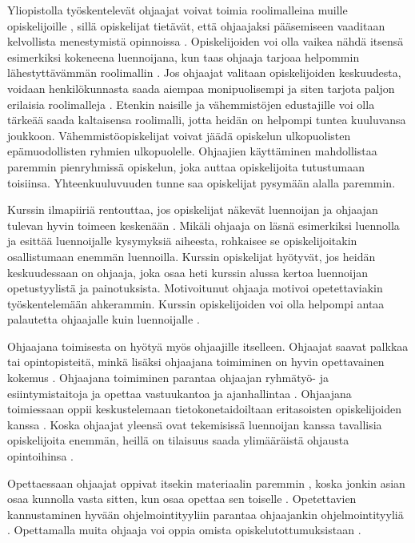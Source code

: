 \documentclass[finnish]{tktltiki2}
\theoremstyle{definition}
\theoremstyle{remark}
\begin{document}
Yliopistolla työskentelevät ohjaajat voivat toimia roolimalleina muille opiskelijoille \cite{Roberts95, Tashakkori05}, sillä opiskelijat tietävät, että ohjaajaksi pääsemiseen vaaditaan kelvollista menestymistä opinnoissa \cite{Bernstein}. Opiskelijoiden voi olla vaikea nähdä itsensä esimerkiksi kokeneena luennoijana, kun taas ohjaaja tarjoaa helpommin lähestyttävämmän roolimallin \cite{Roberts02}. Jos ohjaajat valitaan opiskelijoiden keskuudesta, voidaan henkilökunnasta saada aiempaa monipuolisempi ja siten tarjota paljon erilaisia roolimalleja \cite{Morgan02}. Etenkin naisille ja vähemmistöjen edustajille voi olla tärkeää saada kaltaisensa roolimalli, jotta heidän on helpompi tuntea kuuluvansa joukkoon. Vähemmistöopiskelijat voivat jäädä opiskelun ulkopuolisten epämuodollisten ryhmien ulkopuolelle. Ohjaajien käyttäminen mahdollistaa paremmin pienryhmissä opiskelun, joka auttaa opiskelijoita tutustumaan toisiinsa. Yhteenkuuluvuuden tunne saa opiskelijat pysymään alalla paremmin. \par

Kurssin ilmapiiriä rentouttaa, jos opiskelijat näkevät luennoijan ja ohjaajan tulevan hyvin toimeen keskenään \cite{Dickson11}. Mikäli ohjaaja on läsnä esimerkiksi luennolla ja esittää luennoijalle kysymyksiä aiheesta, rohkaisee se opiskelijoitakin osallistumaan enemmän luennoilla. Kurssin opiskelijat hyötyvät, jos heidän keskuudessaan on ohjaaja, joka osaa heti kurssin alussa kertoa luennoijan opetustyylistä ja painotuksista. Motivoitunut ohjaaja motivoi opetettaviakin työskentelemään ahkerammin. Kurssin opiskelijoiden voi olla helpompi antaa palautetta ohjaajalle kuin luennoijalle \cite{Morgan02}. \par

Ohjaajana toimisesta on hyötyä myös ohjaajille itselleen. Ohjaajat saavat palkkaa tai opintopisteitä, minkä lisäksi ohjaajana toimiminen on hyvin opettavainen kokemus \cite{Reges03}. Ohjaajana toimiminen parantaa ohjaajan ryhmätyö- ja esiintymistaitoja \cite{Reges03} ja opettaa vastuukantoa \cite{Dickson11} ja ajanhallintaa \cite{Aminzadeh}. Ohjaajana toimiessaan oppii keskustelemaan tie\-to\-ko\-ne\-tai\-doil\-taan eritasoisten opiskelijoiden kanssa \cite{Vikberg}. Koska ohjaajat yleensä ovat tekemisissä luennoijan kanssa tavallisia opiskelijoita enemmän, heillä on tilaisuus saada ylimääräistä ohjausta opintoihinsa \cite{Aminzadeh}. \par

Opettaessaan ohjaajat oppivat itsekin materiaalin paremmin \cite{Reges03}, koska jonkin asian osaa kunnolla vasta sitten, kun osaa opettaa sen toiselle \cite{Bernstein, Dickson11}. Opetettavien kannustaminen hyvään ohjelmointityyliin parantaa ohjaajankin ohjelmointityyliä \cite{Roberts95}. Opettamalla muita ohjaaja voi oppia omista opiskelutottumuksistaan \cite{Ferstl10}.  \par
\end{document}

